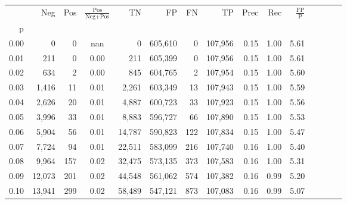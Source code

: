 \begin{tabular}{rrrcrrrrrrrrrrr}
\toprule
{} &     Neg &    Pos & $\frac{\text{Pos}}{\text{Neg}+\text{Pos}}$ &       TN &       FP &       FN &       TP &  Prec &   Rec & $\frac{\text{FP}}{\text{P}}$ \\
p    &         &        &                                            &          &          &          &          &       &       &                              \\
\midrule
0.00 &       0 &      0 &                                        nan &        0 &  605,610 &        0 &  107,956 &  0.15 &  1.00 &                         5.61 \\
0.01 &     211 &      0 &                                       0.00 &      211 &  605,399 &        0 &  107,956 &  0.15 &  1.00 &                         5.61 \\
0.02 &     634 &      2 &                                       0.00 &      845 &  604,765 &        2 &  107,954 &  0.15 &  1.00 &                         5.60 \\
0.03 &   1,416 &     11 &                                       0.01 &    2,261 &  603,349 &       13 &  107,943 &  0.15 &  1.00 &                         5.59 \\
0.04 &   2,626 &     20 &                                       0.01 &    4,887 &  600,723 &       33 &  107,923 &  0.15 &  1.00 &                         5.56 \\
0.05 &   3,996 &     33 &                                       0.01 &    8,883 &  596,727 &       66 &  107,890 &  0.15 &  1.00 &                         5.53 \\
0.06 &   5,904 &     56 &                                       0.01 &   14,787 &  590,823 &      122 &  107,834 &  0.15 &  1.00 &                         5.47 \\
0.07 &   7,724 &     94 &                                       0.01 &   22,511 &  583,099 &      216 &  107,740 &  0.16 &  1.00 &                         5.40 \\
0.08 &   9,964 &    157 &                                       0.02 &   32,475 &  573,135 &      373 &  107,583 &  0.16 &  1.00 &                         5.31 \\
0.09 &  12,073 &    201 &                                       0.02 &   44,548 &  561,062 &      574 &  107,382 &  0.16 &  0.99 &                         5.20 \\
0.10 &  13,941 &    299 &                                       0.02 &   58,489 &  547,121 &      873 &  107,083 &  0.16 &  0.99 &                         5.07 \\

\end{tabular}
